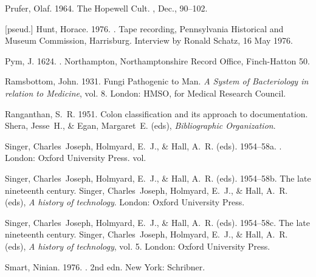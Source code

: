 \begin{thebibliography}{}
Prufer, Olaf. 1964.
\newblock The {Hopewell} Cult.
, Dec., 90--102.

[pseud.] Hunt, Horace. 1976.
.
\newblock Tape recording, Pennsylvania Historical and Museum Commission,
  Harrisburg.
\newblock Interview by {Ronald Schatz, 16 May 1976}.

Pym, J. 1624.
.
\newblock Northampton, Northamptonshire Record Office, Finch-Hatton 50.

Ramsbottom, John. 1931.
\newblock Fungi Pathogenic to Man.
 {\em A System of Bacteriology in relation to
  Medicine},  vol. 8.
\newblock London: HMSO, for Medical Research Council.

Ranganthan, S.~R. 1951.
\newblock Colon classification and its approach to documentation.
 Shera, Jesse~H., \& Egan, Margaret~E. (eds),
  {\em Bibliographic Organization}.

Singer, Charles~Joseph, Holmyard, E.~J., \& Hall, A.~R. (eds). 1954--58a.
.
\newblock London: Oxford University Press.
 vol.

Singer, Charles~Joseph, Holmyard, E.~J., \& Hall, A.~R. (eds). 1954--58b.
\newblock The late nineteenth century.
 Singer, Charles~Joseph, Holmyard, E.~J., \& Hall,
  A.~R. (eds), {\em A history of technology}.
\newblock London: Oxford University Press.

Singer, Charles~Joseph, Holmyard, E.~J., \& Hall, A.~R. (eds). 1954--58c.
\newblock The late nineteenth century.
 Singer, Charles~Joseph, Holmyard, E.~J., \& Hall, A.~R.
  (eds), {\em A history of technology},  vol. 5.
\newblock London: Oxford University Press.

Smart, Ninian. 1976.
. 2nd edn.
\newblock New York: Schribner.


\end{thebibliography}
